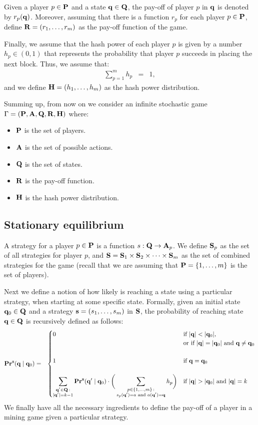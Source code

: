 \documentclass{article}
\begin{document}
Given a player $p \in \mathbf{P}$ and a state $\mathbf{q} \in \mathbf{Q}$, the pay-off of player $p$ in $\mathbf{q}$ is denoted by $r_p(\mathbf{q})$. Moreover, assuming that there is a  function $r_p$ for each player $p \in \mathbf{P}$, define $\mathbf{R} = (r_1, \ldots, r_m)$ as the pay-off function of the game.

Finally, we assume that the hash power of each player $p$ is given by a number $h_p \in (0,1)$ that represents the probability that player $p$ succeeds in placing the next block. Thus, we assume that:
\begin{eqnarray*}
\sum_{p=1}^m h_p & = &  1, 
\end{eqnarray*}and we define $\mathbf{H} = (h_1, \ldots, h_m)$ as the hash power distribution.


Summing up, from now on we consider an infinite stochastic game $\Gamma = (\mathbf{P},\mathbf{A},\mathbf{Q},\mathbf{R},\mathbf{H})$ where:
\begin{itemize}
	\item $\mathbf{P}$ is the set of players.
	\item $\mathbf{A}$ is the set of possible actions.
	\item $\mathbf{Q}$ is the set of states.
	\item $\mathbf{R}$ is the pay-off function.
	\item $\mathbf{H}$ is the hash power distribution.
\end{itemize} 


\subsection{Stationary equilibrium}
A strategy for a player $p \in \mathbf{P}$ is a function $s : \mathbf{Q} \rightarrow \mathbf{A}_p$. 
We define $\mathbf{S}_p$ as the set of all strategies for player $p$, and $\mathbf{S} = \mathbf{S}_{1} \times \mathbf{S}_{2} \times \cdots \times \mathbf{S}_{m}$ as the set of combined strategies for the game (recall that we are assuming that $\mathbf{P} = \{1, \ldots, m\}$ is the set of players). 

Next we define a notion of how likely is reaching a state using a particular strategy, when starting at some specific state. Formally, given an initial state $\mathbf{q}_0 \in \mathbf{Q}$ and a strategy $\mathbf{s} = (s_1, \ldots, s_m)$ in $\mathbf{S}$, 
the probability of reaching state $\mathbf{q} \in \mathbf{Q}$ is recursively defined as follows:
\begin{eqnarray*}
\mathbf{Pr}^{\mathbf{s}}(\mathbf{q} \mid \mathbf{q}_0) & = &
\begin{cases}
0 & \text{if } |\mathbf{q}| < |\mathbf{q}_0|,\\
& \text{or if }  |\mathbf{q}| = |\mathbf{q}_0| \text{ and } \mathbf{q} \neq \mathbf{q}_0\\
&\\
1 & \text{if } \mathbf{q} =  \mathbf{q}_0\\
& \\
{\displaystyle \sum_{\substack{\mathbf{q}' \in \mathbf{Q} \,:\\ |\mathbf{q}'| = k-1}} \mathbf{Pr}^{\mathbf{s}}(\mathbf{q}' \mid \mathbf{q}_0) \cdot \bigg(\sum_{\substack{p \in \{1, \ldots, m\} \,: \\ s_p(\mathbf{q}') = a \text{ and } a(\mathbf{q}') = \mathbf{q}}} h_p\bigg)}
 & \text{if } |\mathbf{q}| > |\mathbf{q}_0| \text{ and } |\mathbf{q}| = k
\end{cases}
\end{eqnarray*}
We finally have all the necessary ingredients to define the pay-off of a player in a mining game given a particular strategy.
\end{document}
